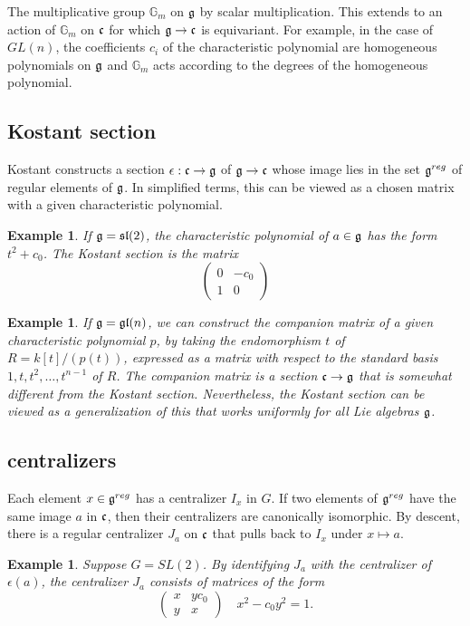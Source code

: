 \documentclass[brochure,english,12pt]{bourbaki}
\newtheorem{example}[equation]{Example}
\newcommand{\ring}[1]{\mathbb{#1}}
\def\gl{\frak{gl}}
\def\sl{\frak{sl}}
\def\g{\frak{g}}
\def\c{\frak{c}}
\begin{document}
The multiplicative group $\ring{G}_m$ on $\g$ by scalar multiplication.  This extends to an action
of $\ring{G}_m$ on $\c$ for which $\g\to\c$ is equivariant.  For example, in
the case of $GL(n)$, the coefficients $c_i$ of the characteristic
polynomial are homogeneous polynomials on $\g$ and $\ring{G}_m$ acts
according to the degrees of the homogeneous polynomial.

\subsection{Kostant section}

Kostant constructs a section $\epsilon:\c\to\g$ of $\g\to\c$ whose image lies in the set $\g^{reg}$ 
of regular elements
of $\g$.  In simplified terms, this can be viewed as a chosen matrix with a given characteristic polynomial.


\begin{example}
If $\g=\sl(2)$, the characteristic polynomial of $a\in\g$ has the form $t^2  +c_0$.
The Kostant section is the matrix
\[
\begin{pmatrix} 0 & -c_0\\ 1 & 0\end{pmatrix}
\]
\end{example}


\begin{example}
  If $\g=\gl(n)$, we can construct the companion matrix of a given
  characteristic polynomial $p$, by taking the endomorphism $t$ of
  $R=k[t]/(p(t))$, expressed as a matrix with respect to the standard
  basis $1,t,t^2,\ldots,t^{n-1}$ of $R$.  The companion matrix is a
  section $\c\to\g$ that is somewhat different from the Kostant
  section.  Nevertheless, the Kostant section can be viewed as a
  generalization of this that works uniformly for all Lie algebras
  $\g$.
\end{example}


\subsection{centralizers}

Each element $x\in\g^{reg}$ has a centralizer $I_x$ in $G$.  If two
elements of $\g^{reg}$ have the same image $a$ in $\c$, then their
centralizers are canonically isomorphic.  By descent, there is a
regular centralizer $J_a$ on $\c$ that pulls back to $I_x$ under
$x\mapsto a$.



\begin{example}  Suppose $G=SL(2)$.  By identifying $J_a$ with the centralizer of
  $\epsilon(a)$, the centralizer $J_a$ consists of
  matrices of the form
\[
\begin{pmatrix} x & y c_0\\ y & x
\end{pmatrix}
\quad x^2 - c_0 y^2 = 1.
\]
\end{example}
\end{document}
